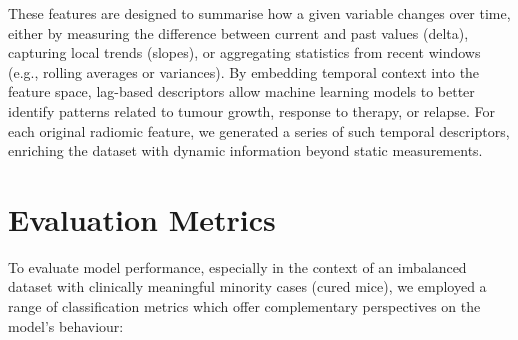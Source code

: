 \documentclass[12pt, a4paper]{report}
\begin{document}
These features are designed to summarise how a given variable changes over time, either by measuring the difference between current and past values (delta), capturing local trends (slopes), or aggregating statistics from recent windows (e.g., rolling averages or variances). By embedding temporal context into the feature space, lag-based descriptors allow machine learning models to better identify patterns related to tumour growth, response to therapy, or relapse. For each original radiomic feature, we generated a series of such temporal descriptors, enriching the dataset with dynamic information beyond static measurements.



\section{Evaluation Metrics}

To evaluate model performance, especially in the context of an imbalanced dataset with clinically meaningful minority cases (cured mice), we employed a range of classification metrics which offer complementary perspectives on the model’s behaviour:
\end{document}
